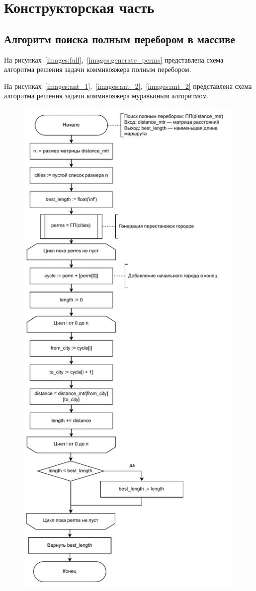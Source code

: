 \chapter{Конструкторская часть}

\section{Алгоритм поиска полным перебором в массиве}

На рисунках~\ref{images:full},~\ref{images:generate_perms} представлена схема алгоритма решения задачи коммивояжера полным перебором.

На рисунках~\ref{images:ant_1},~\ref{images:ant_2},~\ref{images:ant_2} представлена схема алгоритма решения задачи коммивояжера муравьиным алгоритмом.


\begin{figure}[H]
    \centering
    \includegraphics[width=110mm]{images/full}

\end{figure}
